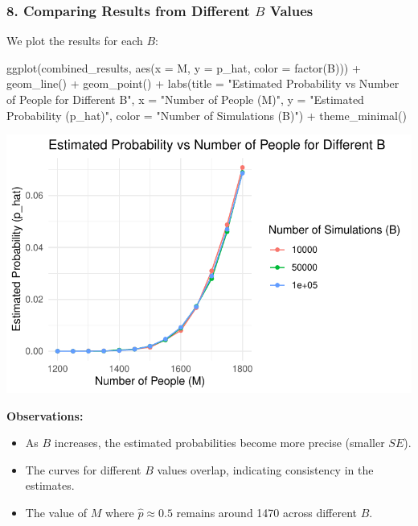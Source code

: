 \documentclass[
  letterpaper,
  DIV=11,
  numbers=noendperiod]{scrartcl}
\newenvironment{Shaded}{\begin{snugshade}}{\end{snugshade}}
\newcommand{\AttributeTok}[1]{\textcolor[rgb]{0.98,0.46,0.51}{#1}}
\newcommand{\FunctionTok}[1]{\textcolor[rgb]{0.70,0.57,0.94}{#1}}
\newcommand{\NormalTok}[1]{\textcolor[rgb]{0.88,0.89,0.91}{#1}}
\newcommand{\SpecialCharTok}[1]{\textcolor[rgb]{0.47,0.72,1.00}{#1}}
\newcommand{\StringTok}[1]{\textcolor[rgb]{0.62,0.80,1.00}{#1}}
\providecommand{\tightlist}{%
  \setlength{\itemsep}{0pt}\setlength{\parskip}{0pt}}\usepackage{longtable,booktabs,array}
\begin{document}
\subsubsection{\texorpdfstring{8. Comparing Results from Different \(B\)
Values}{8. Comparing Results from Different B Values}}\label{comparing-results-from-different-b-values}

We plot the results for each \(B\):

\begin{Shaded}
\begin{Highlighting}[]
\FunctionTok{ggplot}\NormalTok{(combined\_results, }\FunctionTok{aes}\NormalTok{(}\AttributeTok{x =}\NormalTok{ M, }\AttributeTok{y =}\NormalTok{ p\_hat, }\AttributeTok{color =} \FunctionTok{factor}\NormalTok{(B))) }\SpecialCharTok{+}
  \FunctionTok{geom\_line}\NormalTok{() }\SpecialCharTok{+}
  \FunctionTok{geom\_point}\NormalTok{() }\SpecialCharTok{+}
  \FunctionTok{labs}\NormalTok{(}\AttributeTok{title =} \StringTok{"Estimated Probability vs Number of People for Different B"}\NormalTok{,}
       \AttributeTok{x =} \StringTok{"Number of People (M)"}\NormalTok{,}
       \AttributeTok{y =} \StringTok{"Estimated Probability (p\_hat)"}\NormalTok{,}
       \AttributeTok{color =} \StringTok{"Number of Simulations (B)"}\NormalTok{) }\SpecialCharTok{+}
  \FunctionTok{theme\_minimal}\NormalTok{()}
\end{Highlighting}
\end{Shaded}

\includegraphics{Homework-4-BCA_files/figure-pdf/unnamed-chunk-9-1.pdf}

\textbf{Observations:}

\begin{itemize}
\tightlist
\item
  As \(B\) increases, the estimated probabilities become more precise
  (smaller \(SE\)).
\item
  The curves for different \(B\) values overlap, indicating consistency
  in the estimates.
\item
  The value of \(M\) where \(\hat{p} \approx 0.5\) remains around 1470
  across different \(B\).
\end{itemize}
\end{document}
